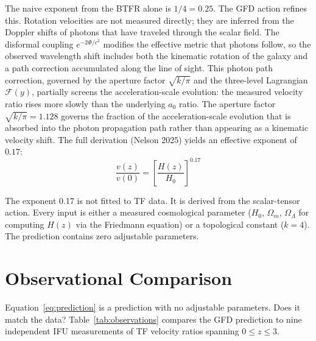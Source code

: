 \documentclass[aps,prd,preprint,superscriptaddress,showpacs,preprintnumbers,amsmath,amssymb,nofootinbib]{revtex4-2}
\begin{document}
The naive exponent from the BTFR alone is $1/4 = 0.25$. The GFD action refines this. Rotation velocities are not measured directly; they are inferred from the Doppler shifts of photons that have traveled through the scalar field. The disformal coupling $e^{-2\Phi/c^2}$ modifies the effective metric that photons follow, so the observed wavelength shift includes both the kinematic rotation of the galaxy and a path correction accumulated along the line of sight. This photon path correction, governed by the aperture factor $\sqrt{k/\pi}$ and the three-level Lagrangian $\mathcal{F}(y)$, partially screens the acceleration-scale evolution: the measured velocity ratio rises more slowly than the underlying $a_0$ ratio. The aperture factor $\sqrt{k/\pi} = 1.128$ governs the fraction of the acceleration-scale evolution that is absorbed into the photon propagation path rather than appearing as a kinematic velocity shift. The full derivation (Nelson 2025) yields an effective exponent of $0.17$:
\begin{equation}
\frac{v(z)}{v(0)} = \left[\frac{H(z)}{H_0}\right]^{0.17}
\label{eq:prediction}
\end{equation}

The exponent 0.17 is not fitted to TF data. It is derived from the scalar-tensor action. Every input is either a measured cosmological parameter ($H_0$, $\Omega_m$, $\Omega_\Lambda$ for computing $H(z)$ via the Friedmann equation) or a topological constant ($k = 4$). The prediction contains zero adjustable parameters.

\section{Observational Comparison}
\label{sec:data}

Equation~\ref{eq:prediction} is a prediction with no adjustable parameters. Does it match the data? Table~\ref{tab:observations} compares the GFD prediction to nine independent IFU measurements of TF velocity ratios spanning $0 \le z \le 3$.
\end{document}
